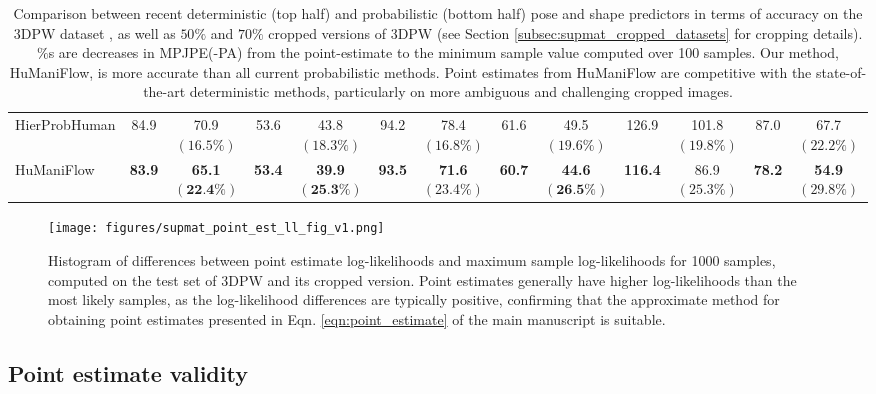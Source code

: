 \begin{table*}[t]
\begin{tabular}{l | c c c c | c c c c | c c c c}
HierProbHuman \cite{sengupta2021hierprobhuman} & 84.9 & 70.9 \scriptsize$(\text{16.5\%})$ & 53.6 & 43.8 \scriptsize$(\text{18.3\%})$ & 94.2 & 78.4 \scriptsize$(\text{16.8\%})$ & 61.6 & 49.5 \scriptsize$(\text{19.6\%})$ & 126.9 & 101.8  \scriptsize$(\text{19.8\%})$ & 87.0 & 67.7 \scriptsize$(\text{22.2\%})$\\
HuManiFlow & \textbf{83.9} & \textbf{65.1} \scriptsize$(\textbf{22.4\%})$ & \textbf{53.4} & \textbf{39.9} \scriptsize$(\textbf{25.3\%})$ & \textbf{93.5} & \textbf{71.6} \scriptsize$(\text{23.4\%})$ & \textbf{60.7} & \textbf{44.6} \scriptsize$(\textbf{26.5\%})$ & \textbf{116.4} & 86.9 \scriptsize$(\text{25.3\%})$ & \textbf{78.2} & \textbf{54.9} \scriptsize$(\text{29.8\%})$\\
\hline
\end{tabular}
\vspace{-0.1cm}
\caption{Comparison between recent deterministic (top half) and probabilistic (bottom half) pose and shape predictors in terms of accuracy on the 3DPW dataset \cite{vonMarcard2018}, as well as $50\%$ and $70\%$ cropped versions of 3DPW (see Section \ref{subsec:supmat_cropped_datasets} for cropping details). $\%$s are decreases in MPJPE(-PA) from the point-estimate to the minimum sample value computed over 100 samples. Our method, HuManiFlow, is more accurate than all current probabilistic methods. Point estimates from HuManiFlow are competitive with the state-of-the-art deterministic methods, particularly on more ambiguous and challenging cropped images.}
\label{table:supmat_3dpw_sota_comparison_accuracy}
\vspace{-0.1cm}
\end{table*}

\begin{figure}
    \centering
    \texttt{[image: figures/supmat\_point\_est\_ll\_fig\_v1.png]}
    \caption{Histogram of differences between point estimate log-likelihoods and maximum sample log-likelihoods for 1000 samples, computed on the test set of 3DPW \cite{vonMarcard2018} and its cropped version. Point estimates generally have higher log-likelihoods than the most likely samples, as the log-likelihood differences are typically positive, confirming that the approximate method for obtaining point estimates presented in Eqn. \ref{eqn:point_estimate} of the main manuscript is suitable.}
    \label{fig:supmat_point_est_ll}
\end{figure}

\subsection{Point estimate validity}

